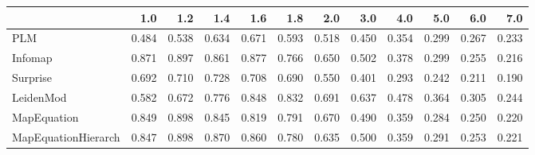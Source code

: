 \begin{tabular}{lrrrrrrrrrrr}
\toprule
{} &   1.0 &   1.2 &   1.4 &   1.6 &   1.8 &   2.0 &   3.0 &   4.0 &   5.0 &   6.0 &   7.0 \\
\midrule
PLM                 & 0.484 & 0.538 & 0.634 & 0.671 & 0.593 & 0.518 & 0.450 & 0.354 & 0.299 & 0.267 & 0.233 \\
Infomap             & 0.871 & 0.897 & 0.861 & 0.877 & 0.766 & 0.650 & 0.502 & 0.378 & 0.299 & 0.255 & 0.216 \\
Surprise            & 0.692 & 0.710 & 0.728 & 0.708 & 0.690 & 0.550 & 0.401 & 0.293 & 0.242 & 0.211 & 0.190 \\
LeidenMod           & 0.582 & 0.672 & 0.776 & 0.848 & 0.832 & 0.691 & 0.637 & 0.478 & 0.364 & 0.305 & 0.244 \\
MapEquation         & 0.849 & 0.898 & 0.845 & 0.819 & 0.791 & 0.670 & 0.490 & 0.359 & 0.284 & 0.250 & 0.220 \\
MapEquationHierarch & 0.847 & 0.898 & 0.870 & 0.860 & 0.780 & 0.635 & 0.500 & 0.359 & 0.291 & 0.253 & 0.221 \\
\bottomrule
\end{tabular}
